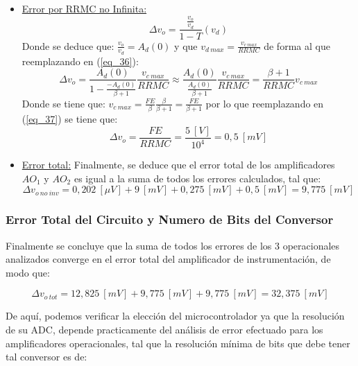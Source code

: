\documentclass[12pt,a4paper]{article}
\begin{document}
\begin{itemize}
    \item \underline{Error por RRMC no Infinita:}
    \begin{equation}
        \label{eq_36}
        \Delta v_{o} = \frac{\frac{v_o}{v_{d}}}{1-T}(v_{d})
    \end{equation}
    Donde se deduce que: $\frac{v_o}{v_{d}}=A_{d}(0)$ y que $v_{d \ max}=\frac{v_{c \ max}}{RRMC}$ de forma al que reemplazando en (\ref{eq_36}):
    \begin{equation}
        \label{eq_37}
        \Delta v_{o} = \frac{A_{d}(0)}{1-\frac{-A_{d}(0)}{\beta+1}} \frac{v_{c \ max}}{RRMC} \approx \frac{A_{d}(0)}{\frac{A_{d}(0)}{\beta+1}}\frac{v_{c \ max}}{RRMC} = \frac{\beta+1}{RRMC}v_{c \ max}
    \end{equation}
    Donde se tiene que: $v_{c \ max}=\frac{FE}{\beta}\frac{\beta}{\beta+1}=\frac{FE}{\beta+1}$ por lo que reemplazando en (\ref{eq_37}) se tiene que:
    \begin{equation}
        \label{eq_38}
        \Delta v_{o} = \frac{FE}{RRMC} = \frac{5 \ [V]}{10^4} = 0,5 \ [mV]
    \end{equation}
    
    \item \underline{Error total:} Finalmente, se deduce que el error total de los amplificadores $AO_{1}$ y $AO_{2}$ es igual a la suma de todos los errores calculados, tal que:
    \begin{equation}
        \label{eq_39}
        \Delta v_{o \ no \ inv} = 0,202 \ [\mu V] + 9 \ [mV] + 0,275 \ [mV]+ 0,5 \ [mV] = 9,775 \ [mV]
    \end{equation}
\end{itemize}



\subsubsection{Error Total del Circuito y Numero de Bits del Conversor}
Finalmente se concluye que la suma de todos los errores de los 3 operacionales analizados converge en el error total del amplificador de instrumentación, de modo que:

\begin{equation}
    \label{eq_40}
    \Delta v_{o \ tot} =  12,825 \ [mV] + 9,775 \ [mV] + 9,775 \ [mV] = 32,375 \ [mV]
\end{equation}

De aquí, podemos verificar la elección del microcontrolador ya que la resolución de su ADC, depende practicamente del análisis de error efectuado para los amplificadores operacionales, tal que la resolución mínima de bits que debe tener tal conversor es de:
\end{document}
